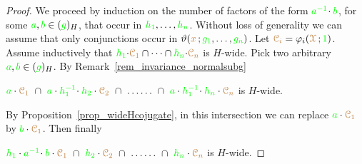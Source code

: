 \begin{proof}
  We proceed by induction on the number of factors of the form ${\color{green} a^{-1}}\!\cdot{\color{green}b}$, for some ${\color{green} a},{\color{green} b}\in({\color{green} g})_H$, that occur in ${\color{green} h_1},\dots,{\color{green} h_n}$.
  Without loss of generality we can assume that only conjunctions occur in $\vartheta({\color{brown} x}\,;{\color{green} g_1},\dots,{\color{green} g_n})$.
  Let ${\color{brown}\EuScript C_i}=\varphi_i({\color{brown}\EuScript X}\,;{\color{green} 1})$.
  Assume inductively that ${\color{green} h_1}{\cdot}{\color{brown}\EuScript C_1}\cap\dots\cap{\color{green}h_n}{\cdot}{\color{brown}\EuScript C_n}$ is $H$-wide.
  Pick two arbitrary ${\color{green} a},{\color{green} b}\in({\color{green} g})_H$.
  By Remark~\ref{rem_invariance_normalsubg}
  
  \hspace*{7ex}${\gr a}\cdot{\mr\C_1}\ \cap\ {\gr a}\cdot{\gr h_1^{-1}}\!\cdot{\gr h_2}\cdot{\mr\C_2}\ \cap\ \dots\dots\ \cap\ {\gr a}\cdot{\gr h_1^{-1}}\!\cdot{\gr h_n}\cdot{\mr\C_n}$ is $H$-wide.
  
  By Proposition~\ref{prop_wideHcojugate}, in this intersection we can replace ${\color{green} a}\cdot{\color{brown}\EuScript C_1}$ by ${\color{green} b}\cdot{\color{brown}\EuScript C_1}$.
  Then finally 

  \hspace*{7ex}${\gr h_1}\cdot{\gr a^{-1}}\!\cdot{\gr b}\cdot{\mr\C_1}\ \cap\ {\gr h_2}\cdot{\mr\C_2}\ \cap\ \dots\dots\ \cap\ {\gr h_n}\cdot{\mr\C_n}$ is $H$-wide.
\end{proof}


